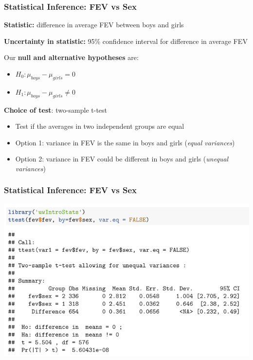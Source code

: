 \documentclass[12pt, 
hyperref={colorlinks=true, linkcolor=blue, urlcolor=cyan}]{beamer}
\begin{document}
\begin{frame}
\frametitle{Statistical Inference: FEV vs Sex}

\textbf{Statistic:} difference in average FEV between boys and girls

\textbf{Uncertainty in statistic:} 95\% confidence interval for difference in average FEV

Our \textbf{null and alternative hypotheses} are: \vspace{-0.3cm}
\begin{itemize}
\item $H_0: \mu_{boys}-\mu_{girls} = 0$
\item $H_1: \mu_{boys}-\mu_{girls} \not= 0$
\end{itemize}

\textbf{Choice of test}: two-sample t-test \vspace{-0.3cm}
\begin{itemize}
\item Test if the averages in two independent groups are equal
\item Option 1: variance in FEV is the same in boys and girls (\textit{equal variances})
\item Option 2: variance in FEV could be different in boys and girls (\textit{unequal variances})
\end{itemize}
\end{frame}

\begin{frame}
\frametitle{Statistical Inference: FEV vs Sex}

\includegraphics[width=\textwidth]{./t-test}

\end{frame}
\end{document}
